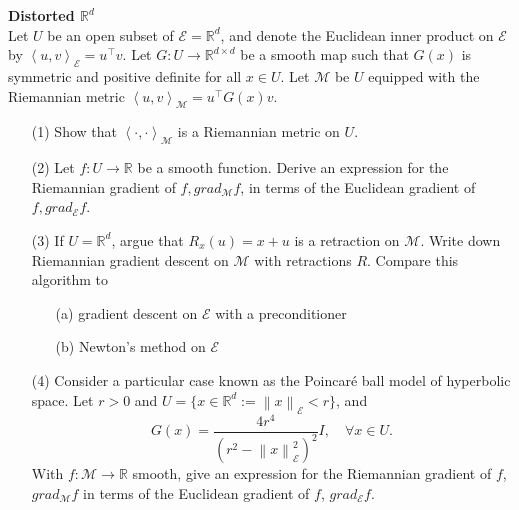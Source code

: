 \documentclass[en, oneside]{assignment}
\begin{document}
\begin{prob} \textbf{Distorted $\mathbb{R}^d$}\\
    Let $U$ be an open subset of $\mathcal{E} = \mathbb{R}^d$, 
    and denote the Euclidean inner product on $\mathcal{E}$ by $\left\langle u, v \right\rangle _\mathcal{E} = u^{\top} v$.
    Let $G: U \rightarrow \mathbb{R}^{d \times d}$ be a smooth map such that $G(x)$ is symmetric and positive definite for all $x \in U$.
    Let $\mathcal{M}$ be $U$ equipped with the Riemannian metric $\left\langle u, v \right\rangle _\mathcal{M}  = u^{\top} G(x) v$.
    \begin{itemize}
        \item[(1)] Show that $\left\langle \cdot, \cdot \right\rangle _\mathcal{M}$ is a Riemannian metric on $U$.
        \item[(2)] Let $f: U \rightarrow \mathbb{R}$ be a smooth function. 
        Derive an expression for the Riemannian gradient of $f, grad _\mathcal{M} f$, in terms of the Euclidean gradient of $f, grad _\mathcal{E} f$.
        \item[(3)] If $U = \mathbb{R}^d$, argue that $R_x(u) = x + u$ is a retraction on $\mathcal{M}$. 
        Write down Riemannian gradient descent on $\mathcal{M}$ with retractions $R$. Compare this algorithm to
        \begin{itemize}
            \item[(a)] gradient descent on $\mathcal{E}$ with a preconditioner
            \item[(b)] Newton's method on $\mathcal{E}$
        \end{itemize}
        \item[(4)] Consider a particular case known as the Poincaré ball model of hyperbolic space. 
        Let $r > 0$ and $U = \{ x \in \mathbb{R}^d := \left\lVert x \right\rVert _\mathcal{E}  < r\}$, and
        \begin{equation*}
            G(x) = \frac{4r^4}{(r^2 - \left\lVert x \right\rVert _\mathcal{E} ^2)^2} I, \quad \forall x \in U.
        \end{equation*}
        With $f: \mathcal{M} \rightarrow \mathbb{R}$ smooth, 
        give an expression for the Riemannian gradient of $f$, $grad _\mathcal{M} f$ in terms of the Euclidean gradient of $f$, $grad _\mathcal{E} f$.
    \end{itemize}
\end{prob}
\end{document}
